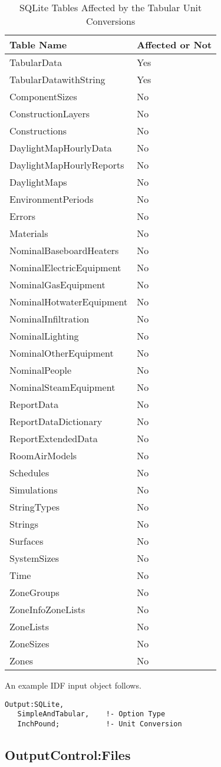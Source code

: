{\scriptsize
\begin{longtable}[c]{p{4in}p{1in}}
\caption{SQLite Tables Affected by the Tabular Unit Conversions\label{table:tabular_unit_conversion_list}} \tabularnewline
\toprule
Table Name & Affected or Not \tabularnewline
\midrule
\endfirsthead

TabularData & Yes \tabularnewline
TabularDatawithString & Yes \tabularnewline
ComponentSizes & No \tabularnewline
ConstructionLayers & No \tabularnewline
Constructions & No  \tabularnewline
DaylightMapHourlyData & No \tabularnewline
DaylightMapHourlyReports & No \tabularnewline
DaylightMaps & No \tabularnewline
EnvironmentPeriods & No \tabularnewline
Errors & No \tabularnewline
Materials & No \tabularnewline
NominalBaseboardHeaters & No \tabularnewline
NominalElectricEquipment & No \tabularnewline
NominalGasEquipment & No \tabularnewline
NominalHotwaterEquipment & No \tabularnewline
NominalInfiltration & No \tabularnewline
NominalLighting & No \tabularnewline
NominalOtherEquipment & No\tabularnewline
NominalPeople & No \tabularnewline
NominalSteamEquipment & No \tabularnewline
ReportData & No \tabularnewline
ReportDataDictionary & No \tabularnewline
ReportExtendedData & No \tabularnewline
RoomAirModels & No \tabularnewline
Schedules & No \tabularnewline
Simulations & No \tabularnewline
StringTypes & No \tabularnewline
Strings & No \tabularnewline
Surfaces & No \tabularnewline
SystemSizes & No \tabularnewline
Time & No \tabularnewline
ZoneGroups & No \tabularnewline
ZoneInfoZoneLists & No \tabularnewline
ZoneLists & No \tabularnewline
ZoneSizes & No \tabularnewline
Zones & No \tabularnewline

\bottomrule
\end{longtable}
}

An example IDF input object follows.
\begin{lstlisting}
Output:SQLite,
   SimpleAndTabular,    !- Option Type
   InchPound;           !- Unit Conversion
\end{lstlisting}

\subsection{OutputControl:Files}\label{outputcontrolfiles}


